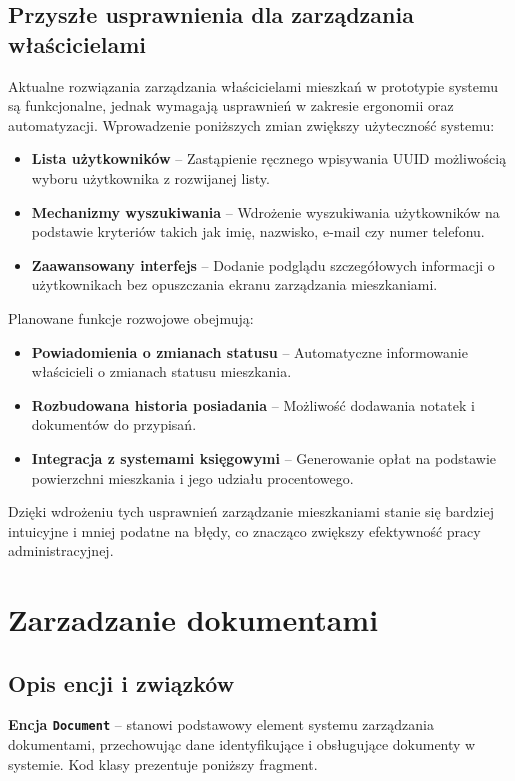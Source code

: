 \subsection{Przyszłe usprawnienia dla zarządzania właścicielami}

Aktualne rozwiązania zarządzania właścicielami mieszkań w prototypie systemu są funkcjonalne, jednak wymagają usprawnień w zakresie ergonomii oraz automatyzacji. Wprowadzenie poniższych zmian zwiększy użyteczność systemu:
\begin{itemize}
    \item \textbf{Lista użytkowników} -- Zastąpienie ręcznego wpisywania UUID możliwością wyboru użytkownika z rozwijanej listy.
    \item \textbf{Mechanizmy wyszukiwania} -- Wdrożenie wyszukiwania użytkowników na podstawie kryteriów takich jak imię, nazwisko, e-mail czy numer telefonu.
    \item \textbf{Zaawansowany interfejs} -- Dodanie podglądu szczegółowych informacji o użytkownikach bez opuszczania ekranu zarządzania mieszkaniami.
\end{itemize}

\noindent Planowane funkcje rozwojowe obejmują:
\begin{itemize}
    \item \textbf{Powiadomienia o zmianach statusu} -- Automatyczne informowanie właścicieli o zmianach statusu mieszkania.
    \item \textbf{Rozbudowana historia posiadania} -- Możliwość dodawania notatek i dokumentów do przypisań.
    \item \textbf{Integracja z systemami księgowymi} -- Generowanie opłat na podstawie powierzchni mieszkania i jego udziału procentowego.
\end{itemize}

Dzięki wdrożeniu tych usprawnień zarządzanie mieszkaniami stanie się bardziej intuicyjne i mniej podatne na błędy, co znacząco zwiększy efektywność pracy administracyjnej.

\section{Zarzadzanie dokumentami}

\subsection{Opis encji i związków}

\textbf{Encja \texttt{Document}} -- stanowi podstawowy element systemu zarządzania dokumentami, przechowując dane identyfikujące i obsługujące dokumenty w systemie. Kod klasy prezentuje poniższy fragment.

